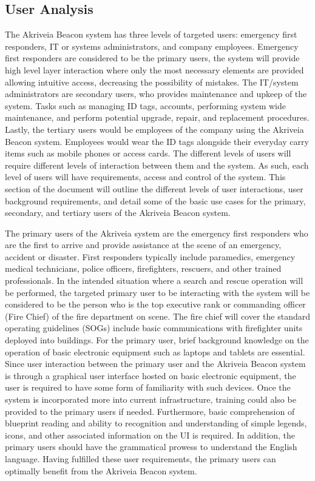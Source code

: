 

\subsection{User Analysis}
\medskip
The Akriveia Beacon system has three levels of targeted users: emergency first responders, IT or systems administrators, and company employees. Emergency first responders are considered to be the primary users, the system will provide high level layer interaction where only the most necessary elements are provided allowing intuitive access, decreasing the possibility of mistakes. The IT/system administrators are secondary users, who provides maintenance and upkeep of the system. Tasks such as managing ID tags, accounts, performing system wide maintenance, and perform potential upgrade, repair, and replacement procedures. Lastly, the tertiary users would be employees of the company using the Akriveia Beacon system. Employees would wear the ID tags alongside their everyday carry items such as mobile phones or access cards. The different levels of users will require different levels of interaction between them and the system. As such, each level of users will have requirements, access and control of the system. This section of the document will outline the different levels of user interactions, user background requirements, and detail some of the basic use cases for the primary, secondary, and tertiary users of the Akriveia Beacon system.

\bigskip
The primary users of the Akriveia system are the emergency first responders who are the first to arrive and provide assistance at the scene of an emergency, accident or disaster. First responders typically include paramedics, emergency medical technicians, police officers, firefighters, rescuers, and other trained professionals. In the intended situation where a search and rescue operation will be performed, the targeted primary user to be interacting with the system will be considered to be the person who is the top executive rank or commanding officer (Fire Chief) of the fire department on scene. The fire chief will cover the standard operating guidelines (SOGs) include basic communications with firefighter units deployed into buildings. For the primary user, brief background knowledge on the operation of basic electronic equipment such as laptops and tablets are essential. Since user interaction between the primary user and the Akriveia Beacon system is through a graphical user interface hosted on basic electronic equipment, the user is required to have some form of familiarity with such devices. Once the system is incorporated more into current infrastructure, training could also be provided to the primary users if needed. Furthermore, basic comprehension of blueprint reading and ability to recognition and understanding of simple legends, icons, and other associated information on the UI is required. In addition, the primary users should have the grammatical prowess to understand the English language. Having fulfilled these user requirements, the primary users can optimally benefit from the Akriveia Beacon system.

